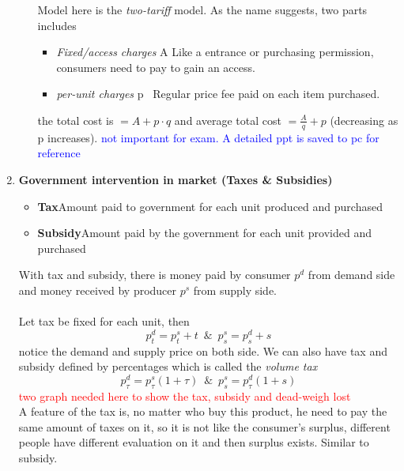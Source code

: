 \documentclass[10pt]{article}
\newenvironment{changemargin}[2]{%
  \begin{list}{}{%
    \setlength{\topsep}{0pt}%
    \setlength{\leftmargin}{#1}%
    \setlength{\rightmargin}{#2}%
    \setlength{\listparindent}{\parindent}%
    \setlength{\itemindent}{\parindent}%
    \setlength{\parsep}{\parskip}%
  }%
  \item[]}{\end{list}}
\begin{document}
\begin{changemargin}{-0.125in}{0in}
\begin{enumerate}
\begin{enumerate}
         \bigskip
         
         Model here is the \textit{two-tariff} model. As the name suggests, two parts includes 
         \begin{itemize} 
             \item  \textit{Fixed/access charges} A\;\;\; Like a entrance or purchasing permission, consumers need to pay to gain an access.
             \item \textit{per-unit charges} p\,\,\, Regular price fee paid on each item purchased.
         \end{itemize} 
         the total cost is $= A + p\cdot q$ and average total cost $ = \frac{A}{q} + p$ (decreasing as p increases). \textcolor{blue}{not important for exam. A detailed ppt is saved to pc for reference}
     \end{enumerate}
    
    \bigskip
    
    \item \textbf{Government intervention in market (Taxes \& Subsidies)}
     
     \medskip
     
     \begin{itemize}
         \item \textbf{Tax}\;\;\;Amount paid to government for each unit produced and purchased
         \item \textbf{Subsidy}\;\;\;Amount paid by the government for each unit provided and purchased
     \end{itemize}
     With tax and subsidy, there is money paid by consumer $p^d$ from demand side and money received by producer $p^s$ from supply side.
     \\
     \\
     Let tax be fixed for each unit, then 
     \[
     p^d_t = p^s_t + t\,\,\,\&\,\,\,p^s_s = p^d_s + s
     \]
     notice the demand and supply price on both side. We can also have tax and subsidy defined by percentages which is called the \textit{volume tax} 
     \[
     p_\tau^d = p_\tau^s(1 + \tau) \,\,\,\&\,\,\, p^s_s=p_\tau^d(1+s)
     \]
     \textcolor{red}{two graph needed here to show the tax, subsidy and dead-weigh lost}
     \\
     A feature of the tax is, no matter who buy this product, he need to pay the same amount of taxes on it, so it is not like the consumer's surplus, different people have different evaluation on it and then surplus exists. Similar to subsidy.
     

\end{enumerate}
\end{changemargin}
\end{document}
